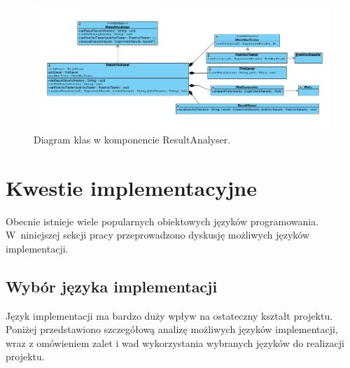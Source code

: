 \documentclass[12pt]{article}
\begin{document}
\begin{figure}[!h]
\centering
	\includegraphics[width=1.2\textwidth]{img/class_diagrams/result_analyser.png}
	\caption{Diagram klas w komponencie ResultAnalyser.}
	\label{fig:classResultAnalyser}
\end{figure}
\newpage


\section{Kwestie implementacyjne}

Obecnie istnieje wiele popularnych obiektowych języków programowania. W~niniejszej sekcji pracy przeprowadzono dyskusję możliwych języków implementacji.

\subsection{Wybór języka implementacji}

Język implementacji ma bardzo duży wpływ na ostateczny kształt projektu. Poniżej przedstawiono szczegółową analizę możliwych języków implementacji, wraz z omówieniem zalet i wad wykorzystania wybranych języków do realizacji projektu.
\end{document}
